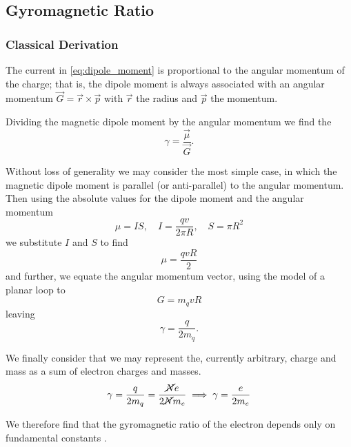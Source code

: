 \subsection{Gyromagnetic Ratio}
\subsubsection{Classical Derivation}
The current in \eqref{eq:dipole_moment} is proportional to the angular momentum of the charge; that is, the dipole moment is always associated with an angular momentum $\vec{G} = \vec{r} \times \vec{p}$ with $\vec{r}$ the radius and $\vec{p}$ the momentum. 

Dividing the magnetic dipole moment by the angular momentum we find the \textbf{} \cite{Chen2020}
\begin{equation}
    \gamma = \frac{\vec{\mu}}{\vec{G}}.
    \label{eq:gyromagnetic_ratio}
\end{equation}

Without loss of generality we may consider the most simple case, in which the magnetic dipole moment is parallel (or anti-parallel) to the angular momentum. Then using the absolute values for the dipole moment and the angular momentum 
\begin{equation}
    \mu = IS, \quad I = 
    \frac{qv}{2\pi R},
    \quad S = \pi R^2 
\end{equation}
we substitute $I$ and $S$ to find 
\begin{equation}
    \mu = \frac{qvR}{2}
\end{equation}
and further, we equate the angular momentum vector, using the model of a planar loop to 
\begin{equation}
   G= m_q v R 
\end{equation}
leaving 
\begin{equation}
    \gamma = \frac{q}{2m_q } . 
\end{equation}

We finally consider that we may represent the, currently arbitrary, charge and mass as a sum of electron charges and masses. 
\begin{equation}
    \gamma = \frac{q}{2m_q } = \frac{\cancel{N}e}{2\cancel{N} m_e} \implies \gamma = \frac{e}{2 m_e}
    \label{eq:gyromagnetic_ratio_electrons}
\end{equation}

We therefore find that the gyromagnetic ratio of the electron depends only on fundamental constants \cite{bromley2000quantum}.



